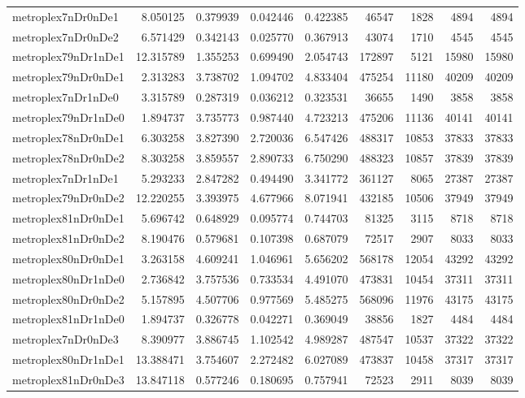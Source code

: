 \begin{longtable}{|l|r|r|r|r|r|r|r|r|}
metroplex7nDr0nDe1 & 8.050125 & 0.379939 & 0.042446 & 0.422385 & 46547 & 1828 & 4894 & 4894 \\
metroplex7nDr0nDe2 & 6.571429 & 0.342143 & 0.025770 & 0.367913 & 43074 & 1710 & 4545 & 4545 \\
metroplex79nDr1nDe1 & 12.315789 & 1.355253 & 0.699490 & 2.054743 & 172897 & 5121 & 15980 & 15980 \\
metroplex79nDr0nDe1 & 2.313283 & 3.738702 & 1.094702 & 4.833404 & 475254 & 11180 & 40209 & 40209 \\
metroplex7nDr1nDe0 & 3.315789 & 0.287319 & 0.036212 & 0.323531 & 36655 & 1490 & 3858 & 3858 \\
metroplex79nDr1nDe0 & 1.894737 & 3.735773 & 0.987440 & 4.723213 & 475206 & 11136 & 40141 & 40141 \\
metroplex78nDr0nDe1 & 6.303258 & 3.827390 & 2.720036 & 6.547426 & 488317 & 10853 & 37833 & 37833 \\
metroplex78nDr0nDe2 & 8.303258 & 3.859557 & 2.890733 & 6.750290 & 488323 & 10857 & 37839 & 37839 \\
metroplex7nDr1nDe1 & 5.293233 & 2.847282 & 0.494490 & 3.341772 & 361127 & 8065 & 27387 & 27387 \\
metroplex79nDr0nDe2 & 12.220255 & 3.393975 & 4.677966 & 8.071941 & 432185 & 10506 & 37949 & 37949 \\
metroplex81nDr0nDe1 & 5.696742 & 0.648929 & 0.095774 & 0.744703 & 81325 & 3115 & 8718 & 8718 \\
metroplex81nDr0nDe2 & 8.190476 & 0.579681 & 0.107398 & 0.687079 & 72517 & 2907 & 8033 & 8033 \\
metroplex80nDr0nDe1 & 3.263158 & 4.609241 & 1.046961 & 5.656202 & 568178 & 12054 & 43292 & 43292 \\
metroplex80nDr1nDe0 & 2.736842 & 3.757536 & 0.733534 & 4.491070 & 473831 & 10454 & 37311 & 37311 \\
metroplex80nDr0nDe2 & 5.157895 & 4.507706 & 0.977569 & 5.485275 & 568096 & 11976 & 43175 & 43175 \\
metroplex81nDr1nDe0 & 1.894737 & 0.326778 & 0.042271 & 0.369049 & 38856 & 1827 & 4484 & 4484 \\
metroplex7nDr0nDe3 & 8.390977 & 3.886745 & 1.102542 & 4.989287 & 487547 & 10537 & 37322 & 37322 \\
metroplex80nDr1nDe1 & 13.388471 & 3.754607 & 2.272482 & 6.027089 & 473837 & 10458 & 37317 & 37317 \\
metroplex81nDr0nDe3 & 13.847118 & 0.577246 & 0.180695 & 0.757941 & 72523 & 2911 & 8039 & 8039 \\

\end{longtable}
